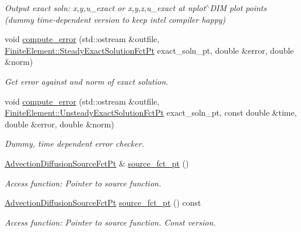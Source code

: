 \begin{DoxyCompactItemize}
\begin{DoxyCompactList}\small\item\em Output exact soln\+: x,y,u\+\_\+exact or x,y,z,u\+\_\+exact at nplot$^\wedge$\+D\+IM plot points (dummy time-\/dependent version to keep intel compiler happy) \end{DoxyCompactList}\item 
void \hyperlink{classoomph_1_1AdvectionDiffusionEquations_acb1fcfb29911210ad7c0bc252f0ed665}{compute\+\_\+error} (std\+::ostream \&outfile, \hyperlink{classoomph_1_1FiniteElement_a690fd33af26cc3e84f39bba6d5a85202}{Finite\+Element\+::\+Steady\+Exact\+Solution\+Fct\+Pt} exact\+\_\+soln\+\_\+pt, double \&error, double \&norm)
\begin{DoxyCompactList}\small\item\em Get error against and norm of exact solution. \end{DoxyCompactList}\item 
void \hyperlink{classoomph_1_1AdvectionDiffusionEquations_a87c8c4e8ff5ea6e6dcb243ec83bb4fd2}{compute\+\_\+error} (std\+::ostream \&outfile, \hyperlink{classoomph_1_1FiniteElement_ad4ecf2b61b158a4b4d351a60d23c633e}{Finite\+Element\+::\+Unsteady\+Exact\+Solution\+Fct\+Pt} exact\+\_\+soln\+\_\+pt, const double \&time, double \&error, double \&norm)
\begin{DoxyCompactList}\small\item\em Dummy, time dependent error checker. \end{DoxyCompactList}\item 
\hyperlink{classoomph_1_1AdvectionDiffusionEquations_aa892578e0cffe209775da9f5ac84bd03}{Advection\+Diffusion\+Source\+Fct\+Pt} \& \hyperlink{classoomph_1_1AdvectionDiffusionEquations_af760c608d973514288373c11a4180002}{source\+\_\+fct\+\_\+pt} ()
\begin{DoxyCompactList}\small\item\em Access function\+: Pointer to source function. \end{DoxyCompactList}\item 
\hyperlink{classoomph_1_1AdvectionDiffusionEquations_aa892578e0cffe209775da9f5ac84bd03}{Advection\+Diffusion\+Source\+Fct\+Pt} \hyperlink{classoomph_1_1AdvectionDiffusionEquations_a7579712ec3c4ec95c5144d37bf4264a6}{source\+\_\+fct\+\_\+pt} () const
\begin{DoxyCompactList}\small\item\em Access function\+: Pointer to source function. Const version. \end{DoxyCompactList}\item 

\end{DoxyCompactItemize}
